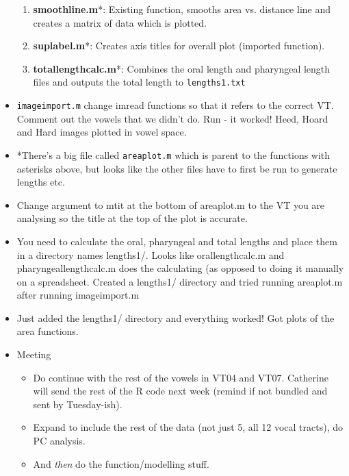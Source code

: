 \documentclass{article}
\begin{document}
\begin{itemize}
\begin{enumerate}
        \item \textbf{smoothline.m}*: Existing function, smooths area vs. distance line and creates a matrix of data which is plotted.
        \item \textbf{suplabel.m}*: Creates axis titles for overall plot (imported function).
        \item \textbf{totallengthcalc.m}*: Combines the oral length and pharyngeal length files and outputs the total length to \verb|lengths1.txt|
    \end{enumerate}
    \item \verb|imageimport.m| change imread functions so that it refers to the correct VT. Comment out the vowels that we didn't do. Run - it worked! Heed, Hoard and Hard images plotted in vowel space.
    \item *There's a big file called \verb|areaplot.m| which is parent to the functions with asterisks above, but looks like the other files have to first be run to generate lengths etc.
    \item Change argument to mtit at the bottom of areaplot.m to the VT you are analysing so the title at the top of the plot is accurate.
    \item You need to calculate the oral, pharyngeal and total lengths and place them in a directory names lengths1/. Looks like orallengthcalc.m and pharyngeallengthcalc.m does the calculating (as opposed to doing it manually on a spreadsheet. Created a lengths1/ directory and tried running areaplot.m after running imageimport.m
    \item Just added the lengths1/ directory and everything worked! Got plots of the area functions.
    
    \item Meeting
    \begin{itemize}
        \item Do continue with the rest of the vowels in VT04 and VT07. Catherine will send the rest of the R code next week (remind if not bundled and sent by Tuesday-ish).
        \item Expand to include the rest of the data (not just 5, all 12 vocal tracts), do PC analysis.
        \item And \textit{then} do the function/modelling stuff.
    \end{itemize}
        
\end{itemize}
\end{document}
